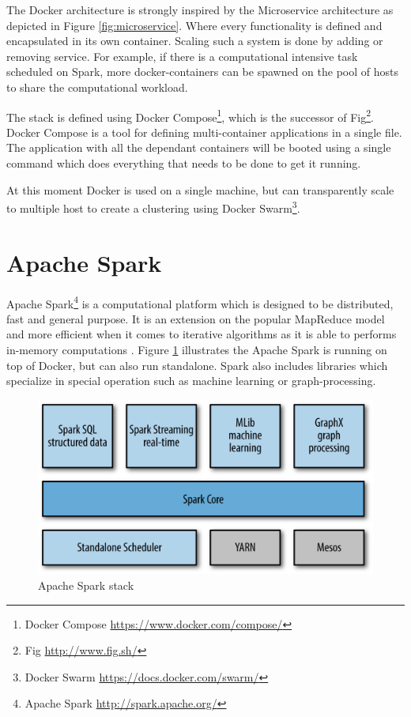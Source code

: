 The Docker architecture is strongly inspired by the Microservice architecture as depicted in Figure \ref{fig:microservice}. Where every functionality is defined and encapsulated in its own container. Scaling such a system is done by adding or removing service. For example, if there is a computational intensive task scheduled on Spark, more docker-containers can be spawned on the pool of hosts to share the computational workload.

The stack is defined using Docker Compose\footnote{Docker Compose \url{https://www.docker.com/compose/}}, which is the successor of Fig\footnote{Fig \url{http://www.fig.sh/}}. Docker Compose is a tool for defining multi-container applications in a single file. The application with all the dependant containers will be booted using a single command which does everything that needs to be done to get it running.

At this moment Docker is used on a single machine, but can transparently scale to multiple host to create a clustering using Docker Swarm\footnote{Docker Swarm \url{https://docs.docker.com/swarm/}}. 


\section{Apache Spark \label{subsec_spark}}

Apache Spark\footnote{Apache Spark \url{http://spark.apache.org/}} is a computational platform which is designed to be distributed, fast and general purpose. It is an extension on the popular MapReduce model \cite{Dean:2008:MSD:1327452.1327492} and more efficient when it comes to iterative algorithms as it is able to performs in-memory computations \cite{Xin:2013:SSR:2463676.2465288}. Figure \ref{fig:sparkstack} illustrates the Apache Spark is running on top of Docker, but can also run standalone. Spark also includes libraries which specialize in special operation such as machine learning or graph-processing.

\begin{figure}[ht!]
\centering
\includegraphics[width=.9\textwidth]{figures/sparkstack.png}
\caption{Apache Spark stack \label{fig:sparkstack}}
\end{figure}

